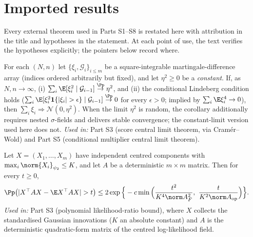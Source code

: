 \clearpage
\section{Imported results}\label{part:s0}

Every external theorem used in Parts S1--S8 is restated here with
attribution in the title and hypotheses in the statement. At each point of
use, the text verifies the hypotheses explicitly; the pointers below record
where.

\begin{proposition}\label{imp:hh}
For each $(N,n)$ let $\{\xi_i,\mathcal G_i\}_{i\le m}$ be a square-integrable
martingale-difference array (indices ordered arbitrarily but fixed), and let
$\eta^2\ge0$ be a \emph{constant}. If, as $N,n\to\infty$,
(i) $\sum_i\E[\xi_i^2\mid\mathcal G_{i-1}]\overset{\Pp}{\to}\eta^2$, and
(ii) the conditional Lindeberg condition holds
($\sum_i\E[\xi_i^2\mathbf 1\{|\xi_i|>\epsilon\}\mid\mathcal G_{i-1}]
\overset{\Pp}{\to}0$ for every $\epsilon>0$; implied by
$\sum_i\E\xi_i^4\to0$), then $\sum_i\xi_i\Rightarrow\mathcal N(0,\eta^2)$.
When the limit $\eta^2$ is random, the corollary additionally requires
nested $\sigma$-fields and delivers stable convergence; the constant-limit
version used here does not.
\emph{Used in:} Part S3 (score central limit theorem, via Cram\'er--Wold)
and Part S5 (conditional multiplier central limit theorem).
\end{proposition}

\begin{proposition}\label{imp:hw}
Let $X=(X_1,\ldots,X_m)$ have independent centred components with
$\max_i\norm{X_i}_{\psi_2}\le K$, and let $A$ be a deterministic $m\times m$
matrix. Then for every $t\ge0$,
\[
 \Pp\big(|X^\top AX-\E X^\top AX|>t\big)
 \le2\exp\Big\{-c\min\Big(\frac{t^2}{K^4\norm A_F^2},\
 \frac{t}{K^2\norm A_{\mathrm{op}}}\Big)\Big\}.
\]
\emph{Used in:} Part S3 (polynomial likelihood-ratio bound), where $X$ collects the
standardised Gaussian innovations ($K$ an absolute constant) and $A$ is the
deterministic quadratic-form matrix of the centred log-likelihood field.
\end{proposition}

